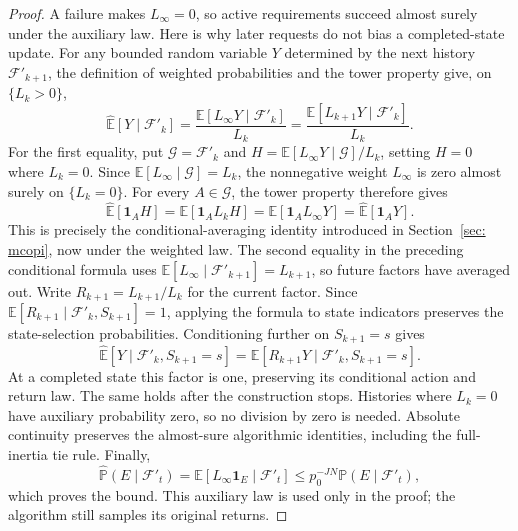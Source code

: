\begin{proof}
A failure makes $L_\infty=0$, so active requirements succeed almost surely under the auxiliary law. Here is why later requests do not bias a completed-state update. For any bounded random variable $Y$ determined by the next history $\mathcal F'_{k+1}$, the definition of weighted probabilities and the tower property give, on $\{L_k>0\}$,
\[
\widehat{\mathbb E}[Y\mid\mathcal F'_k]
=\frac{\mathbb E[L_\infty Y\mid\mathcal F'_k]}{L_k}
=\frac{\mathbb E[L_{k+1}Y\mid\mathcal F'_k]}{L_k}.
\]
For the first equality, put $\mathcal G=\mathcal F'_k$ and $H=\mathbb E[L_\infty Y\mid\mathcal G]/L_k$, setting $H=0$ where $L_k=0$. Since $\mathbb E[L_\infty\mid\mathcal G]=L_k$, the nonnegative weight $L_\infty$ is zero almost surely on $\{L_k=0\}$. For every $A\in\mathcal G$, the tower property therefore gives
\[
\widehat{\mathbb E}[\mathbf1_AH]
=\mathbb E[\mathbf1_A L_kH]
=\mathbb E[\mathbf1_A L_\infty Y]
=\widehat{\mathbb E}[\mathbf1_AY].
\]
This is precisely the conditional-averaging identity introduced in Section~\ref{sec: mcopi}, now under the weighted law. The second equality in the preceding conditional formula uses $\mathbb E[L_\infty\mid\mathcal F'_{k+1}]=L_{k+1}$, so future factors have averaged out. Write $R_{k+1}=L_{k+1}/L_k$ for the current factor. Since $\mathbb E[R_{k+1}\mid\mathcal F'_k,S_{k+1}]=1$, applying the formula to state indicators preserves the state-selection probabilities. Conditioning further on $S_{k+1}=s$ gives
\[
\widehat{\mathbb E}[Y\mid\mathcal F'_k,S_{k+1}=s]
=\mathbb E[R_{k+1}Y\mid\mathcal F'_k,S_{k+1}=s].
\]
At a completed state this factor is one, preserving its conditional action and return law. The same holds after the construction stops. Histories where $L_k=0$ have auxiliary probability zero, so no division by zero is needed. Absolute continuity preserves the almost-sure
algorithmic identities, including the full-inertia tie rule. Finally,
\[
\widehat{\mathbb P}(E\mid\mathcal F'_t)=\mathbb E[L_\infty\mathbf1_E\mid\mathcal F'_t]
\le p_0^{-JN}\mathbb P(E\mid\mathcal F'_t),
\]
which proves the bound. This auxiliary law is used only in the proof; the algorithm still
samples its original returns.
\end{proof}
